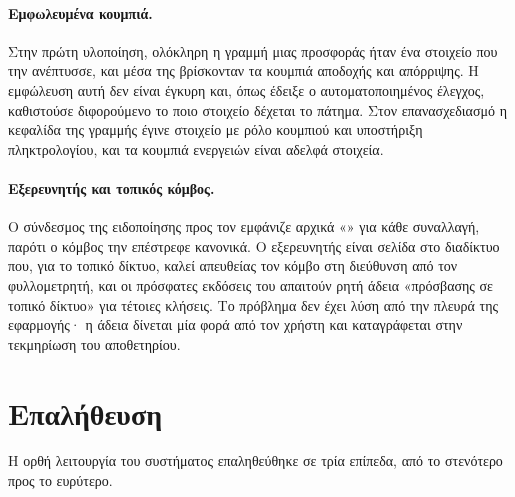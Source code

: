 \paragraph{Εμφωλευμένα κουμπιά.} Στην πρώτη υλοποίηση, ολόκληρη η γραμμή μιας προσφοράς
ήταν ένα στοιχείο  που την ανέπτυσσε, και μέσα της βρίσκονταν τα κουμπιά
αποδοχής και απόρριψης. Η εμφώλευση αυτή δεν είναι έγκυρη  και, όπως έδειξε ο
αυτοματοποιημένος έλεγχος, καθιστούσε διφορούμενο το ποιο στοιχείο δέχεται το πάτημα. Στον
επανασχεδιασμό η κεφαλίδα της γραμμής έγινε στοιχείο με ρόλο κουμπιού και υποστήριξη
πληκτρολογίου, και τα κουμπιά ενεργειών είναι αδελφά στοιχεία.

\paragraph{Εξερευνητής και τοπικός κόμβος.} Ο σύνδεσμος της ειδοποίησης προς τον
 εμφάνιζε αρχικά «» για κάθε
συναλλαγή, παρότι ο κόμβος την επέστρεφε κανονικά. Ο εξερευνητής είναι σελίδα 
στο διαδίκτυο που, για το τοπικό δίκτυο, καλεί απευθείας τον κόμβο στη διεύθυνση
 από τον φυλλομετρητή, και οι πρόσφατες εκδόσεις του 
απαιτούν ρητή άδεια «πρόσβασης σε τοπικό δίκτυο» για τέτοιες κλήσεις. Το πρόβλημα δεν
έχει λύση από την πλευρά της εφαρμογής· η άδεια δίνεται μία φορά από τον χρήστη και
καταγράφεται στην τεκμηρίωση του αποθετηρίου.

\section{Επαλήθευση}
\label{sec:verification}

Η ορθή λειτουργία του συστήματος επαληθεύθηκε σε τρία επίπεδα, από το στενότερο προς το
ευρύτερο.

